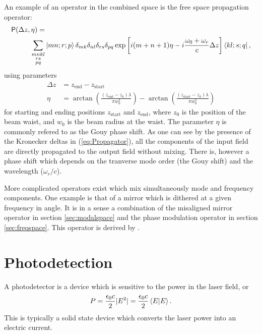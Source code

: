 An example of an operator in the combined space is the free space propagation operator:
\begin{align}
\label{eq:Propagator}
\mathsf{P}(\Delta z,\eta) = & \\
\sum_{\substack{mnkl\\rs\\pq}}& \left| mn;r;p \right>
\delta_{mk}\delta_{nl}\delta_{rs}\delta_{pq}
\exp  \left[i(m+n+1)\eta
-i\frac{\omega_0+\omega_r}{c}\Delta z\right] 
\left< kl;s;q \right|, \notag
\end{align}
using parameters
\begin{align*}
\Delta z &= z_{\text{end}}-z_{\text{start}} \\
\eta &= \arctan \left( \frac{(z_{\text{end}}-z_0)\lambda}{\pi w_0^2}\right)- 
        \arctan \left( \frac{(z_{\text{start}}-z_0)\lambda}{\pi w_0^2}\right)
\end{align*}
for starting and ending positions $z_{\text{start}}$ and $z_{\text{end}}$, where $z_0$ is the position of the beam waist, and $w_0$ is the beam radius at the waist. %
The parameter $\eta$ is commonly refered to as the Gouy phase shift. %
As one can see by the presence of the Kronecker deltas in (\ref{eq:Propagator}), all the components of the input field are directly propagated to the output field without mixing. %
There is, however a phase shift which depends on the tranverse mode order (the Gouy shift) and the wavelength ($\omega_r/c$).

More complicated operators exist which mix simultaneously mode and frequency components. %
One example is that of a mirror which is dithered at a given frequency in angle. %
It is in a sense a combination of the misaligned mirror operator in section \ref{sec:modalspace} and the phase modulation operator in section \ref{sec:freqspace}. %
This operator is derived by \citet{Sigg:00}.
\section{Photodetection}
A photodetector is a device which is sensitive to the power in the laser field, or
\begin{equation}
P=\frac{\epsilon_0 c}{2}|E^2|=\frac{\epsilon_0 c}{2}\inprod{E}{E}.
\end{equation}
This is typically a solid state device which converts the laser power into an electric current.

